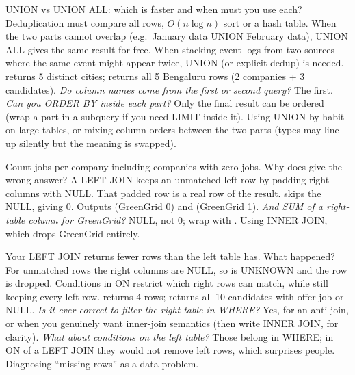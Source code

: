 \begin{qa}{\classic UNION vs UNION ALL: which is faster and when must you use each?}
\why Deduplication must compare all rows, $O(n\log n)$ sort or a hash table. When the two parts cannot overlap (e.g.\ January data UNION February data),
UNION ALL gives the same result for free. When stacking event logs from two sources where the same event might appear twice, UNION (or explicit
dedup) is needed.
\worked {} returns 5 distinct cities;  returns all 5 Bengaluru rows (2 companies + 3 candidates).
\pushes \emph{Do column names come from the first or second query?} The first. \emph{Can you ORDER BY inside each part?} Only the final result can be
ordered (wrap a part in a subquery if you need LIMIT inside it).
\pitfall Using UNION by habit on large tables, or mixing column orders between the two parts (types may line up silently but the meaning is swapped).
\end{qa}

\begin{qa}{Count jobs per company including companies with zero jobs. Why does  give the wrong answer?}
\why A LEFT JOIN keeps an unmatched left row by padding right columns with NULL. That padded row is a real row of the result. 
skips the NULL, giving 0.
\worked Outputs  (GreenGrid 0) and  (GreenGrid 1).
\pushes \emph{And SUM of a right-table column for GreenGrid?} NULL, not 0; wrap with .
\pitfall Using INNER JOIN, which drops GreenGrid entirely.
\end{qa}

\begin{qa}{Your LEFT JOIN returns fewer rows than the left table has. What happened?}
\why For unmatched rows the right columns are NULL, so  is UNKNOWN and the row is dropped. Conditions in ON restrict which
right rows can match, while still keeping every left row.
\worked {} returns 4 rows;  returns all 10 candidates with offer job or NULL.
\pushes \emph{Is it ever correct to filter the right table in WHERE?} Yes,  for an anti-join, or when you genuinely want
inner-join semantics (then write INNER JOIN, for clarity). \emph{What about conditions on the left table?} Those belong in WHERE; in ON of a LEFT JOIN
they would not remove left rows, which surprises people.
\pitfall Diagnosing ``missing rows'' as a data problem.
\end{qa}

